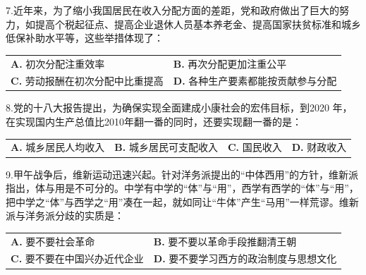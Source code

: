 \documentclass[UTF8,11pt]{ctexart}
\begin{document}
7.近年来，为了缩小我国居民在收入分配方面的差距，党和政府做出了巨大的努力，如提高个税起征点、提高企业退休人员基本养老金、提高国家扶贫标准和城乡低保补助水平等，这些举措体现了：


\begin{center}\begin{tabular}{>{\raggedright\arraybackslash}p{\dimexpr(\linewidth-4\tabcolsep)/2\relax}>{\raggedright\arraybackslash}p{\dimexpr(\linewidth-4\tabcolsep)/2\relax}}
\textbf{A.} 初次分配注重效率 & \textbf{B.} 再次分配更加注重公平\\[.35em]
\textbf{C.} 劳动报酬在初次分配中比重提高 & \textbf{D.} 各种生产要素都能按贡献参与分配\\[.35em]\end{tabular}\end{center}

8.党的十八大报告提出，为确保实现全面建成小康社会的宏伟目标，到2020 年，在实现国内生产总值比2010年翻一番的同时，还要实现翻一番的是：


\begin{center}\begin{tabular}{>{\raggedright\arraybackslash}p{\dimexpr(\linewidth-8\tabcolsep)/4\relax}>{\raggedright\arraybackslash}p{\dimexpr(\linewidth-8\tabcolsep)/4\relax}>{\raggedright\arraybackslash}p{\dimexpr(\linewidth-8\tabcolsep)/4\relax}>{\raggedright\arraybackslash}p{\dimexpr(\linewidth-8\tabcolsep)/4\relax}}
\textbf{A.} 城乡居民人均收入 & \textbf{B.} 城乡居民可支配收入 & \textbf{C.} 国民收入 & \textbf{D.} 财政收入\\[.35em]\end{tabular}\end{center}

9.甲午战争后，维新运动迅速兴起。针对洋务派提出的“中体西用”的方针，维新派指出，体与用是不可分的。中学有中学的“体”与“用”，西学有西学的“体”与“用”，把中学之“体”与西学之“用”凑在一起，就如同让“牛体”产生“马用”一样荒谬。维新派与洋务派分歧的实质是：


\begin{center}\begin{tabular}{>{\raggedright\arraybackslash}p{\dimexpr(\linewidth-4\tabcolsep)/2\relax}>{\raggedright\arraybackslash}p{\dimexpr(\linewidth-4\tabcolsep)/2\relax}}
\textbf{A.} 要不要社会革命 & \textbf{B.} 要不要以革命手段推翻清王朝\\[.35em]
\textbf{C.} 要不要在中国兴办近代企业 & \textbf{D.} 要不要学习西方的政治制度与思想文化\\[.35em]\end{tabular}\end{center}
\end{document}
